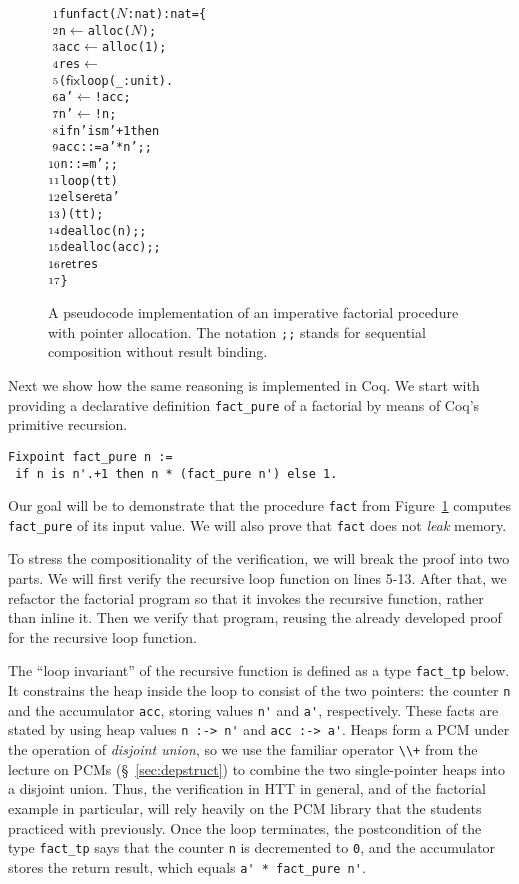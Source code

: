 \documentclass[blockstyle,preprint,nocopyrightspace]{sigplanconf}
\newcommand{\asgn}{\leftarrow}
\newcommand{\code}[1]{\lstinline{#1}}
\newcommand{\var}[1]{\({#1}\)}
\newcommand{\num}[1]{\({\text{{\scriptsize{#1}}}}\)}
\newcommand{\ret}{\mathsf{ret}}
\newcommand{\fix}{\mathsf{fix}}
\begin{document}
\begin{figure}
{\small
\begin{alltt}
\num{ 1}  fun fact (\var{N} : nat) : nat = \{
\num{ 2}      n   \(\asgn\) alloc(\var{N});
\num{ 3}      acc \(\asgn\) alloc(1); 
\num{ 4}      res \(\asgn\) 
\num{ 5}        (\(\fix\) loop (_ : unit). 
\num{ 6}            a' \(\asgn\) !acc;
\num{ 7}            n' \(\asgn\) !n;
\num{ 8}            if n' is m' + 1 then
\num{ 9}               acc ::= a' * n';;
\num{10}               n   ::= m';;
\num{11}               loop(tt) 
\num{12}            else \(\ret\) a'
\num{13}         )(tt);
\num{14}      dealloc(n);;
\num{15}      dealloc(acc);;
\num{16}      \(\ret\) res
\num{17}  \}
\end{alltt}
}
\caption{A pseudocode implementation of an imperative factorial
  procedure with pointer allocation. The notation \texttt{\small{;;}}
  stands for sequential composition without result binding.}
\label{fig:fact}
\end{figure}

Next we show how the same reasoning is implemented in Coq. We start
with providing a declarative definition \code{fact_pure} of a
factorial by means of Coq's primitive recursion.


\begin{lstlisting}
Fixpoint fact_pure n := 
 if n is n'.+1 then n * (fact_pure n') else 1.
\end{lstlisting}
%
Our goal will be to demonstrate that the procedure \code{fact} from
Figure~\ref{fig:fact} computes \code{fact_pure} of its input value. We
will also prove that \code{fact} does not \emph{leak} memory.

To stress the compositionality of the verification, we will break the
proof into two parts. We will first verify the recursive loop function
on lines 5-13. After that, we refactor the factorial program so that
it invokes the recursive function, rather than inline it. Then we
verify that program, reusing the already developed proof for the
recursive loop function.


The ``loop invariant'' of the recursive function is defined as a type
\code{fact_tp} below. It constrains the heap inside the loop to
consist of the two pointers: the counter \code{n} and the accumulator
\code{acc}, storing values \code{n'} and \code{a'}, respectively.
These facts are stated by using heap values \code{n :-> n'} and
\code{acc :-> a'}. Heaps form a PCM under the operation of
\emph{disjoint union}, so we use the familiar operator \code{\\+} from
the lecture on PCMs (\S~\ref{sec:depstruct}) to combine the two
single-pointer heaps into a disjoint union. Thus, the verification in
HTT in general, and of the factorial example in particular, will rely
heavily on the PCM library that the students practiced with
previously. Once the loop terminates, the postcondition of the type
\code{fact_tp} says that the counter \code{n} is decremented to
\code{0}, and the accumulator stores the return result, which equals
\code{a' * fact_pure n'}.
\end{document}
